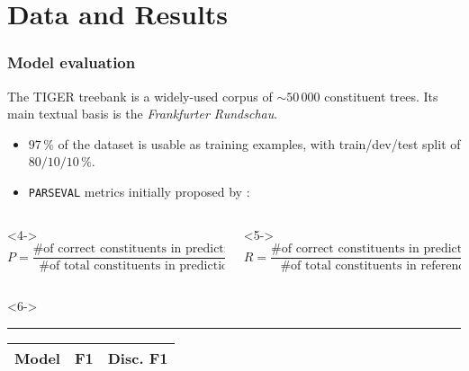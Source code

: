 \documentclass[8pt,handout]{beamer}
\theoremstyle{definition}
\theoremstyle{plain}
\theoremstyle{definition}
\theoremstyle{remark}
\numberwithin{equation}{section}
\numberwithin{figure}{section}
\numberwithin{table}{section}
\begin{document}
\section{Data and Results}
\begin{frame}
    \frametitle{Model evaluation}
    The TIGER treebank is a widely-used corpus of \(\sim\!50\,000\) constituent trees. Its main textual basis is the \textit{Frankfurter Rundschau}.
    \begin{itemize}
        \item<2-> \(97\,\%\) of the dataset is usable as training examples, with train/dev/test split of \(80/10/10\,\%\).
        \item<3-> \texttt{PARSEVAL} metrics initially proposed by \textcite{black1991procedure}:
    \end{itemize}
    \setlength{\abovedisplayskip}{0pt}%
    \setlength{\belowdisplayskip}{0pt}%
    \setlength{\abovedisplayshortskip}{0pt}%
    \setlength{\belowdisplayshortskip}{0pt}%
    \begin{columns}[t,onlytextwidth]
        \begin{column}{0.5\textwidth}<4->
            \begin{equation*}
              P = \frac{\text{\# of correct constituents in prediction}}{\text{\# of total constituents in prediction}};  
            \end{equation*}%
        \end{column}
        \begin{column}{0.5\textwidth}<5->
            \begin{equation*}
                R = \frac{\text{\# of correct constituents in prediction}}{\text{\# of total constituents in reference}}.
            \end{equation*}%
        \end{column}
    \end{columns}%
%
    \begin{columns}[onlytextwidth]
        \begin{column}[t]{0.48\textwidth}<6->
            \hrule height 0pt
            \begin{table}
                \begin{tabular}[t]{@{}
                    >{\arraybackslash}p{(\textwidth - 6.5em)}@{}
                    >{\centering\arraybackslash}p{3em}@{}
                    >{\centering\arraybackslash}p{4em}@{}}
                    \toprule
                    \textbf{Model} & \textbf{F1} & \textbf{Disc. F1} \\ \midrule

\end{tabular}
\end{table}
\end{column}
\end{columns}
\end{frame}
\end{document}
